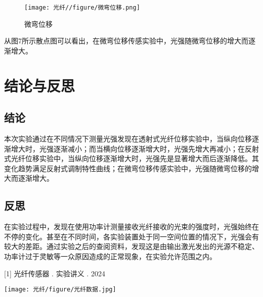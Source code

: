 \documentclass[UTF8]{ctexart}
\begin{document}
\begin{figure}[!h]
    \centering
    \texttt{[image: 光纤//figure/微弯位移.png]}
    \caption{微弯位移}
\end{figure}
\vspace{1em}

从图7所示散点图可以看出，在微弯位移传感实验中，光强随微弯位移的增大而逐渐增大。


\section{结论与反思}

\subsection{结论}
本次实验通过在不同情况下测量光强发现在透射式光纤位移实验中，当纵向位移逐渐增大时，光强逐渐减小；而当横向位移逐渐增大时，光强先增大再减小；在反射式光纤位移实验中，当纵向位移逐渐增大时，光强先是显著增大而后逐渐降低。其变化趋势满足反射式调制特性曲线；在微弯位移传感实验中，光强随微弯位移的增大而逐渐增大。
\subsection{反思}
在实验过程中，发现在使用功率计测量接收光纤接收的光束的强度时，光强始终在不停的变化。甚至在不同时间，各实验装置处于同一空间位置的情况下，光强会有较大的差距。通过实验之后的查阅资料，发现这是由输出激光发出的光源不稳定、功率计过于灵敏等一众原因造成的正常现象，在实验允许范围之内。

\vspace{2em}

\vspace{1em}
[1] 光纤传感器 . 实验讲义 . 2024

\vspace{2em}


\begin{figure*}
    \centering
    \texttt{[image: 光纤/figure/光纤数据.jpg]}
\end{figure*}
\end{document}
